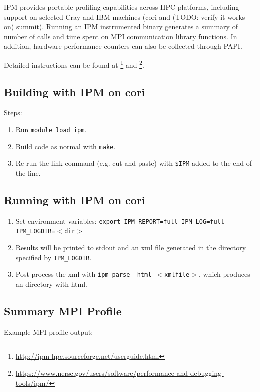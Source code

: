 IPM provides portable profiling capabilities across HPC platforms,
including support on selected Cray and IBM machines (cori and (TODO:
verify it works on) summit).  Running an IPM instrumented binary generates
a summary of number of calls and time spent on MPI communication library
functions.  In addition, hardware performance counters can also be
collected through PAPI.

Detailed instructions can be found at \footnote{\url{http://ipm-hpc.sourceforge.net/userguide.html}} and
\footnote{\url{https://www.nersc.gov/users/software/performance-and-debugging-tools/ipm/}}.

\subsection{Building with IPM on cori}

Steps:
\begin{enumerate}
\item Run {\tt module load ipm}.
\item Build code as normal with {\tt make}.
\item Re-run the link command (e.g. cut-and-paste) with {\tt \$IPM} added to the end of the line.
\end{enumerate}

\subsection{Running with IPM on cori}

\begin{enumerate}
\item Set environment variables: {\tt export IPM\_REPORT=full IPM\_LOG=full IPM\_LOGDIR=$<$dir$>$}
\item Results will be printed to stdout and an xml file generated in the directory specified by {\tt IPM\_LOGDIR}.
\item Post-process the xml with {\tt ipm\_parse -html $<$xmlfile$>$}, which produces an directory with html.
\end{enumerate}

\subsection{Summary MPI Profile}

Example MPI profile output:

